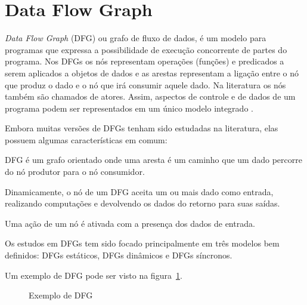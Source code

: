 
\section{Data Flow Graph}

\textit{Data Flow Graph} (DFG) ou grafo de fluxo de dados, é um modelo para 
programas que expressa a possibilidade de execução concorrente de partes do
programa. 
Nos DFGs os nós representam operações (funções) e predicados a serem
aplicados a objetos de dados e as arestas representam a ligação entre o nó que
produz o dado e o nó que irá consumir aquele dado.
Na literatura os nós também são chamados de atores.
Assim, aspectos de controle e de dados de um programa podem ser representados 
em um único modelo integrado \cite{eopc}.

Embora muitas versões de DFGs tenham sido estudadas na literatura, elas possuem 
algumas características em comum:

\begin{alineas}
        \item DFG é um grafo orientado onde uma aresta é um caminho que um dado
        percorre do nó produtor para o nó consumidor.
        \item Dinamicamente, o nó de um DFG aceita um ou mais dado como entrada,
        realizando computações e devolvendo os dados do retorno para suas
        saídas.
        \item Uma ação de um nó é ativada com a presença dos dados de entrada.
\end{alineas}

Os estudos em DFGs tem sido focado principalmente em três modelos bem definidos:
DFGs estáticos, DFGs dinâmicos e DFGs síncronos.

Um exemplo de DFG pode ser visto na figura~\ref{dfg_ex}.

\begin{figure}[h]
\centering
\label{dfg_ex}
\caption{Exemplo de DFG}
\end{figure}




